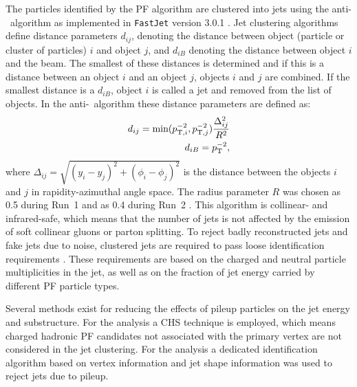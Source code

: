 The particles identified by the \ac{PF} algorithm
are clustered into jets using the anti-\kT~algorithm \cite{antiKT} as implemented
in \texttt{FastJet} version 3.0.1 \cite{fastjet}. Jet clustering algorithms 
define distance parameters $d_{ij}$, denoting the distance between object (particle or cluster of 
particles) $i$ and 
object $j$, and $d_{iB}$ denoting the distance between 
object $i$ and the beam. The smallest of these distances
is determined and if this is a distance between an object $i$ and an object $j$, objects
$i$ and $j$ are combined. If the smallest distance is a $d_{iB}$, object $i$
is called a jet and removed from the list of objects. In the anti-\kT~algorithm
these distance parameters are defined as:
\begin{align}\label{eqn:objects_antikt}
d_{ij}=\text{min}(p_{\text{T},i}^{-2},p_{\text{T},j}^{-2})\frac{\Delta_{ij}^2}{R^2}\notag\\
d_{iB} = p_{\text{T}}^{-2},
\end{align}
where $\Delta_{ij} = \sqrt{(y_i-y_j)^2+(\phi_i - \phi_j)^2}$ is the distance
between the objects $i$ and $j$ in rapidity-azimuthal angle space. The radius
parameter $R$ was chosen as 0.5 during Run~1 \cite{cms-jec-2011} and as 0.4 during Run~2 \cite{cms-jets-run2}. 
This algorithm is collinear- and infrared-safe, which means that the number of jets
is not affected by the emission of soft collinear gluons or parton splitting.
To reject badly reconstructed jets and fake jets due to noise, clustered jets are required to 
pass loose identification requirements \cite{cms-jet-algos-run1,cms-jets-run2}. These requirements are based on the 
charged and neutral particle multiplicities in the jet, as well as on the fraction
of jet energy carried by different \ac{PF} particle types.

Several methods exist for reducing the effects of pileup particles 
on the jet energy and substructure.
For the \AHtotautau analysis a
\ac{CHS} technique \cite{cms-jets-run2} is employed, 
which means charged hadronic \ac{PF} candidates not associated with the primary vertex 
are not considered in the jet clustering. For the 
\Htohhtobbtautau analysis a dedicated identification algorithm \cite{cms-jets-puid} 
based on vertex information and jet shape information was used to reject jets due to pileup.

